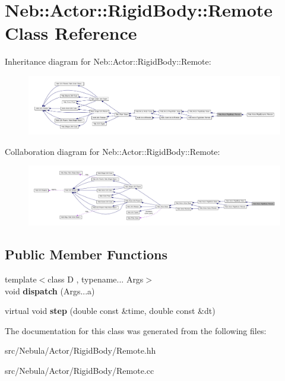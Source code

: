 \hypertarget{classNeb_1_1Actor_1_1RigidBody_1_1Remote}{\section{\-Neb\-:\-:\-Actor\-:\-:\-Rigid\-Body\-:\-:\-Remote \-Class \-Reference}
\label{classNeb_1_1Actor_1_1RigidBody_1_1Remote}
}


\-Inheritance diagram for \-Neb\-:\-:\-Actor\-:\-:\-Rigid\-Body\-:\-:\-Remote\-:\nopagebreak
\begin{figure}[H]
\begin{center}
\leavevmode
\includegraphics[width=350pt]{classNeb_1_1Actor_1_1RigidBody_1_1Remote__inherit__graph}
\end{center}
\end{figure}


\-Collaboration diagram for \-Neb\-:\-:\-Actor\-:\-:\-Rigid\-Body\-:\-:\-Remote\-:\nopagebreak
\begin{figure}[H]
\begin{center}
\leavevmode
\includegraphics[width=350pt]{classNeb_1_1Actor_1_1RigidBody_1_1Remote__coll__graph}
\end{center}
\end{figure}
\subsection*{\-Public \-Member \-Functions}
\begin{DoxyCompactItemize}
\item 
\hypertarget{classNeb_1_1Actor_1_1RigidBody_1_1Remote_a8ee888c98df0312d281f2be0dd90fe69}{{\footnotesize template$<$class D , typename... \-Args$>$ }\\void {\bfseries dispatch} (\-Args...\-a)}\label{classNeb_1_1Actor_1_1RigidBody_1_1Remote_a8ee888c98df0312d281f2be0dd90fe69}

\item 
\hypertarget{classNeb_1_1Actor_1_1RigidBody_1_1Remote_a3ea9f3f45a5d5796970cb0228036fb12}{virtual void {\bfseries step} (double const \&time, double const \&dt)}\label{classNeb_1_1Actor_1_1RigidBody_1_1Remote_a3ea9f3f45a5d5796970cb0228036fb12}

\end{DoxyCompactItemize}


\-The documentation for this class was generated from the following files\-:\begin{DoxyCompactItemize}
\item 
src/\-Nebula/\-Actor/\-Rigid\-Body/\-Remote.\-hh\item 
src/\-Nebula/\-Actor/\-Rigid\-Body/\-Remote.\-cc\end{DoxyCompactItemize}
